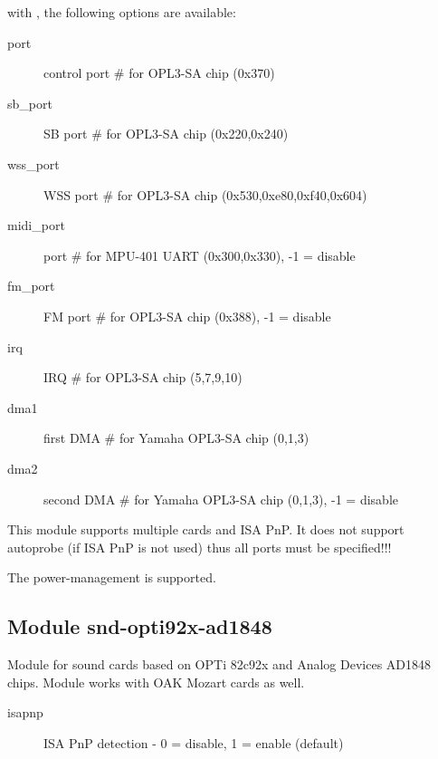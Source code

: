 \documentclass[a4paper,8pt,english]{sphinxmanual}
\begin{document}
with , the following options are available:
\begin{description}
\item[{port}] \leavevmode
control port \# for OPL3-SA chip (0x370)

\item[{sb\_port}] \leavevmode
SB port \# for OPL3-SA chip (0x220,0x240)

\item[{wss\_port}] \leavevmode
WSS port \# for OPL3-SA chip (0x530,0xe80,0xf40,0x604)

\item[{midi\_port}] \leavevmode
port \# for MPU-401 UART (0x300,0x330), -1 = disable

\item[{fm\_port}] \leavevmode
FM port \# for OPL3-SA chip (0x388), -1 = disable

\item[{irq}] \leavevmode
IRQ \# for OPL3-SA chip (5,7,9,10)

\item[{dma1}] \leavevmode
first DMA \# for Yamaha OPL3-SA chip (0,1,3)

\item[{dma2}] \leavevmode
second DMA \# for Yamaha OPL3-SA chip (0,1,3), -1 = disable

\end{description}

This module supports multiple cards and ISA PnP.  It does not support
autoprobe (if ISA PnP is not used) thus all ports must be specified!!!

The power-management is supported.


\subsection{Module snd-opti92x-ad1848}
\label{sound/alsa-configuration:module-snd-opti92x-ad1848}
Module for sound cards based on OPTi 82c92x and Analog Devices AD1848 chips.
Module works with OAK Mozart cards as well.
\begin{description}
\item[{isapnp}] \leavevmode
ISA PnP detection - 0 = disable, 1 = enable (default)

\end{description}
\end{document}
